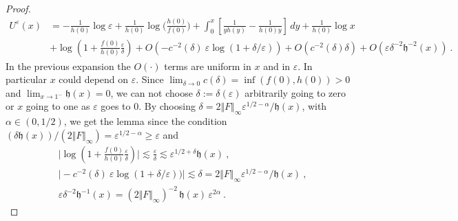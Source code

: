 \documentclass[reqno, 12pt, a4paper]{amsart}
\theoremstyle{plain}
\theoremstyle{definition}
\begin{document}
\begin{proof}
\begin{equation}
\begin{split}
U^\varepsilon(x) &= -\frac{1}{h(0)} \log \varepsilon +  \frac{1}{h(0)}  \log \Big(\frac{h(0)}{f(0)} \Big) +  \int_{0}^x \left[ \frac{1}{y h(y)} -\frac{1}{h(0)y} \right] \, dy  +  \frac{1}{h(0)} \log x \\
& + \log \left( 1+ \frac{f(0)}{h(0)} \frac{\varepsilon}{\delta} \right)  +   O (- c^{-2} (\delta) \  \varepsilon \log (1+ \delta/\varepsilon)) + O(c^{-2} (\delta) \delta) + O( \varepsilon \delta^{-2} {\mathfrak h}^{-2} (x)) \ .
\end{split}
\end{equation}
In the previous expansion the $O(\cdot)$ terms are uniform in $x$ and in $\varepsilon$. In particular $x$ could depend on $\varepsilon$. Since $\lim_{\delta \to 0} c(\delta) = \inf(f(0), h(0))>0$ and $\lim_{x \to 1^-} {\mathfrak h}(x) =0$,  we can not choose $\delta:=\delta(\varepsilon)$ arbitrarily going to zero or $x$ going to one as $\varepsilon$ goes to $0$. By choosing $\delta = 2 \Vert F \Vert_{\infty}  \varepsilon^{1/2-\alpha}/ {\mathfrak h}(x)$, with $\alpha \in (0,1/2)$, we get the lemma since the condition $(\delta {\mathfrak h}(x))/(2\Vert F \Vert_{\infty})= \varepsilon^{1/2- \alpha} \ge \varepsilon$ and
\begin{equation}
\begin{split}
&\vert \log \left( 1+ \frac{f(0)}{h(0)} \frac{\varepsilon}{\delta} \right) \vert \lesssim \frac{\varepsilon}{\delta} \lesssim \varepsilon^{1/2+\delta} {\mathfrak h}(x) \ , \\
&\vert - c^{-2} (\delta) \  \varepsilon \log (1+ \delta/\varepsilon)) \vert  \lesssim \delta =2 \Vert F \Vert_{\infty}  \varepsilon^{1/2-\alpha}/ {\mathfrak h}(x) \ , \\
&\varepsilon \delta^{-2} {\mathfrak h}^{-1} (x) = (2 \Vert F \Vert_{\infty})^{-2} \, {\mathfrak h} (x) \, \varepsilon^{2\alpha} \ .
\end{split}
\end{equation}
 \end{proof}



%
\end{document}
